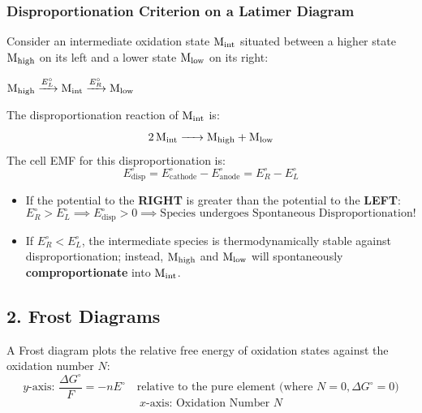 \subsubsection{Disproportionation Criterion on a Latimer Diagram}
Consider an intermediate oxidation state $\ce{M_{int}}$ situated between a higher state $\ce{M_{high}}$ on its left and a lower state $\ce{M_{low}}$ on its right:
\begin{center}
$\ce{M_{high}} \xrightarrow{E^\circ_L} \ce{M_{int}} \xrightarrow{E^\circ_R} \ce{M_{low}}$
\end{center}
The disproportionation reaction of $\ce{M_{int}}$ is:
\begin{equation}
    \ce{2M_{int} -> M_{high} + M_{low}}
\end{equation}
The cell EMF for this disproportionation is:
\begin{equation}
    E^\circ_{\text{disp}} = E^\circ_{\text{cathode}} - E^\circ_{\text{anode}} = E^\circ_R - E^\circ_L
\end{equation}
\begin{conceptbox}
\begin{itemize}[leftmargin=*]
    \item If the potential to the \textbf{RIGHT} is greater than the potential to the \textbf{LEFT}:
    \begin{equation}
        \boxed{E^\circ_R > E^\circ_L \implies E^\circ_{\text{disp}} > 0 \implies \text{Species undergoes Spontaneous Disproportionation!}}
    \end{equation}
    \item If $E^\circ_R < E^\circ_L$, the intermediate species is thermodynamically stable against disproportionation; instead, $\ce{M_{high}}$ and $\ce{M_{low}}$ will spontaneously \textbf{comproportionate} into $\ce{M_{int}}$.
\end{itemize}
\end{conceptbox}

\subsection{2. Frost Diagrams}
A Frost diagram plots the relative free energy of oxidation states against the oxidation number $N$:
\begin{equation}
    y\text{-axis: } \frac{\Delta G^\circ}{F} = -n E^\circ \quad \text{relative to the pure element (where } N = 0, \Delta G^\circ = 0\text{)}
\end{equation}
\begin{equation}
    x\text{-axis: Oxidation Number } N
\end{equation}

